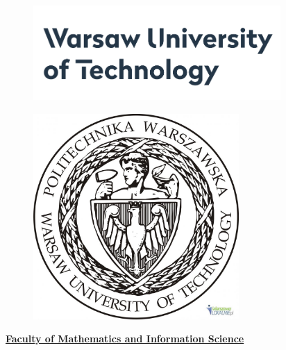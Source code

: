 \documentclass[12pt]{article}
\begin{document}

\begin{figure}[H]
	\begin{Center}
		\includegraphics[width=3.71in,height=1.44in]{./media/image1.png}
	\end{Center}
\end{figure}



\par




\begin{figure}[H]
	\begin{Center}
		\includegraphics[width=3.08in,height=3.08in]{./media/image2.jpeg}
	\end{Center}
\end{figure}



\par


\vspace{\baselineskip}
\begin{Center}
 {\fontsize{16pt}{19.2pt}\selectfont \textbf{\uline{Faculty of Mathematics and Information Science}}\par}
\end{Center}\par
\end{document}
